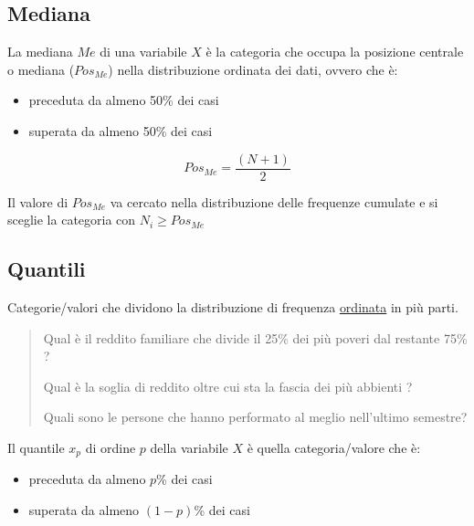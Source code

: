 \documentclass[
  a4paper,
  DIV=11,
  numbers=noendperiod]{scrreprt}
\begin{document}
\subsection{Mediana}\label{mediana}

La mediana \(Me\) di una variabile \(X\) è la categoria che occupa la
posizione centrale o mediana (\(Pos_{Me}\)) nella distribuzione ordinata
dei dati, ovvero che è:

\begin{itemize}
\item preceduta da almeno 50\% dei casi
\item superata da almeno 50\% dei casi
\end{itemize}

\begin{equation*}
Pos_{Me} = \dfrac{(N+1)}{2}
\end{equation*}

Il valore di \(Pos_{Me}\) va cercato nella distribuzione delle frequenze
cumulate e si sceglie la categoria con \(N_i \geq Pos_{Me}\)

\subsection{Quantili}\label{quantili}

Categorie/valori che dividono la distribuzione di frequenza
\underline{ordinata} in più parti.

\begin{quote}
Qual è il reddito familiare che divide il 25\% dei più poveri dal restante 75\% ?
    
Qual è la soglia di reddito oltre cui sta la fascia dei più
    abbienti ?
    
Quali sono le persone che hanno performato al meglio nell'ultimo semestre?
\end{quote}

Il quantile \(x_p\) di ordine \(p\) della variabile \(X\) è quella
categoria/valore che è:

\begin{itemize}
\item preceduta da almeno $p$\% dei casi
\item superata da almeno $(1-p)$\% dei casi
\end{itemize}
\end{document}
